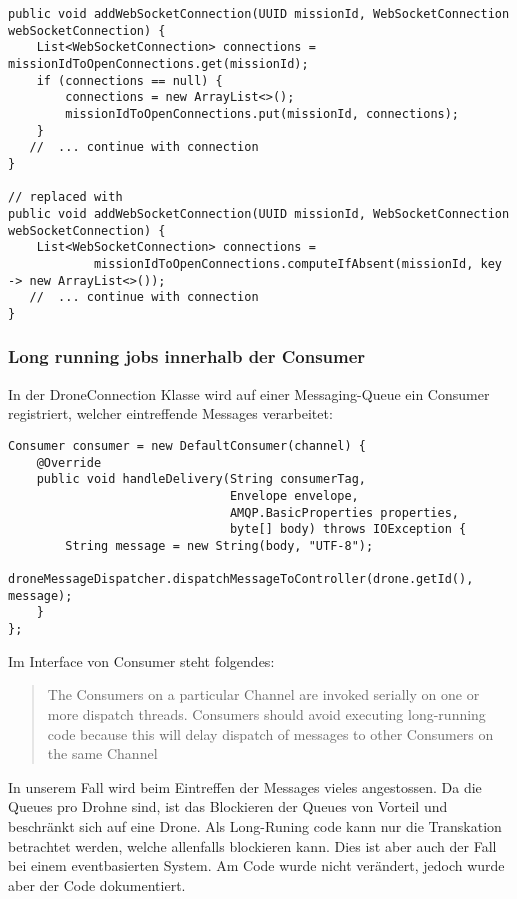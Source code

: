 \begin{lstlisting}
public void addWebSocketConnection(UUID missionId, WebSocketConnection webSocketConnection) {
    List<WebSocketConnection> connections = missionIdToOpenConnections.get(missionId);
    if (connections == null) {
        connections = new ArrayList<>();
        missionIdToOpenConnections.put(missionId, connections);
    }
   //  ... continue with connection
}

// replaced with
public void addWebSocketConnection(UUID missionId, WebSocketConnection webSocketConnection) {
    List<WebSocketConnection> connections =
            missionIdToOpenConnections.computeIfAbsent(missionId, key -> new ArrayList<>());
   //  ... continue with connection
}
\end{lstlisting}


\subsubsection{Long running jobs innerhalb der Consumer}
In der DroneConnection Klasse wird auf einer Messaging-Queue ein Consumer registriert, welcher eintreffende Messages verarbeitet:
\begin{lstlisting}
Consumer consumer = new DefaultConsumer(channel) {
    @Override
    public void handleDelivery(String consumerTag,
                               Envelope envelope,
                               AMQP.BasicProperties properties,
                               byte[] body) throws IOException {
        String message = new String(body, "UTF-8");
        droneMessageDispatcher.dispatchMessageToController(drone.getId(), message);
    }
};
\end{lstlisting}

Im Interface von Consumer steht folgendes:
\begin{quote} 
The Consumers on a particular Channel are invoked serially on one or more dispatch threads. Consumers should avoid executing long-running code because this will delay dispatch of messages to other Consumers on the same Channel	
\end{quote}

In unserem Fall wird beim Eintreffen der Messages vieles angestossen. Da die Queues pro Drohne sind, ist das Blockieren der Queues von Vorteil und beschränkt sich auf eine Drone. Als Long-Runing code kann nur die Transkation betrachtet werden, welche allenfalls blockieren kann. Dies ist aber auch der Fall bei einem eventbasierten System. Am Code wurde nicht verändert, jedoch wurde aber der Code dokumentiert.

